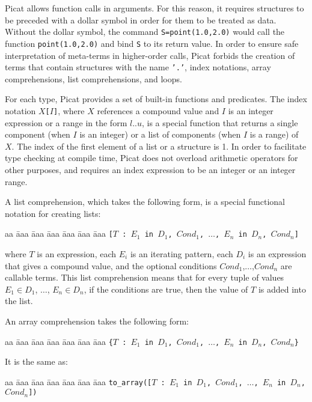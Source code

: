 Picat allows function calls in arguments. For this reason, it requires structures to be preceded with a dollar symbol in order for them to be treated as data. Without the dollar symbol, the command \texttt{S=point(1.0,2.0)} would call the function \texttt{point(1.0,2.0)} and bind \texttt{S} to its return value. In order to ensure safe interpretation of meta-terms in higher-order calls, Picat forbids the creation of terms that contain structures with the name \texttt{'.'}, index notations, array comprehensions, list comprehensions, and loops.

For each type, Picat provides a set of built-in functions and predicates. The index notation \texttt{$X$[$I$]}, where $X$ references a compound value and $I$ is an integer expression or a range in the form $l..u$, is a special function that returns a single component (when $I$ is an integer) or a list of components (when $I$ is a range) of $X$. The index of the first element of a list or a structure is 1. In order to facilitate type checking at compile time, Picat does not overload arithmetic operators for other purposes, and requires an index expression to be an integer or an integer range.

A list comprehension, which takes the following form, is a special functional notation for creating lists:
\begin{tabbing}
aa \= aaa \= aaa \= aaa \= aaa \= aaa \= aaa \kill
\> \> \texttt{[$T$ : $E_1$ \texttt{in} $D_1$, $Cond_1$, $\ldots$, $E_n$ in $D_n$, $Cond_n$]} 
\end{tabbing}
where $T$ is an expression, each $E_i$ is an iterating pattern, each $D_i$ is an expression that gives a compound value, and the optional conditions $Cond_1$,$\ldots$,$Cond_n$  are callable terms. This list comprehension means that for every tuple of values $E_1 \in D_1$, $\ldots$, $E_n \in D_n$, if the conditions are true, then the value of $T$ is added into the list.

An array comprehension takes the following form:
\begin{tabbing}
aa \= aaa \= aaa \= aaa \= aaa \= aaa \= aaa \kill
\> \> \texttt{\{$T$ : $E_1$ \texttt{in} $D_1$, $Cond_1$, $\ldots$, $E_n$ in $D_n$, $Cond_n$\}} 
\end{tabbing}
It is the same as:
\begin{tabbing}
aa \= aaa \= aaa \= aaa \= aaa \= aaa \= aaa \kill
\> \> \texttt{to\_array([$T$ : $E_1$ \texttt{in} $D_1$, $Cond_1$, $\ldots$, $E_n$ in $D_n$, $Cond_n$])} 
\end{tabbing}

